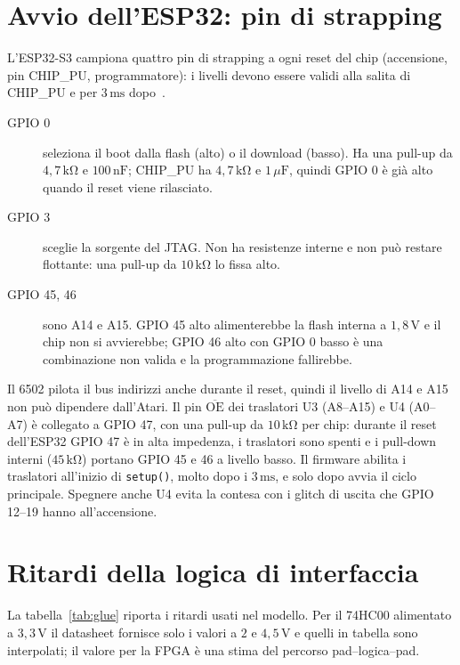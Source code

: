\documentclass[11pt,a4paper,twoside,openright]{report}
\DeclareRobustCommand{\code}[1]{\begingroup\renewcommand{\_}{\textunderscore\allowbreak}\texttt{#1}\endgroup}
\newcommand{\sig}[1]{\textsf{#1}}
\begin{document}
\section{Avvio dell'ESP32: pin di strapping}
\label{sec:strapping}

L'ESP32-S3 campiona quattro pin di strapping a ogni reset del chip (accensione, pin
\sig{CHIP\_PU}, programmatore): i livelli devono essere validi alla salita di \sig{CHIP\_PU}
e per $3\,\mathrm{ms}$ dopo~\cite{esp32s3ds}.
\begin{description}
  \item[GPIO 0] seleziona il boot dalla flash (alto) o il download (basso). Ha una pull-up
        da $4{,}7\,\mathrm{k\Omega}$ e $100\,\mathrm{nF}$; \sig{CHIP\_PU} ha
        $4{,}7\,\mathrm{k\Omega}$ e $1\,\mu\mathrm{F}$, quindi GPIO 0 è già alto quando il
        reset viene rilasciato.
  \item[GPIO 3] sceglie la sorgente del JTAG. Non ha resistenze interne e non può restare
        flottante: una pull-up da $10\,\mathrm{k\Omega}$ lo fissa alto.
  \item[GPIO 45, 46] sono A14 e A15. GPIO 45 alto alimenterebbe la flash interna a
        $1{,}8\,\mathrm{V}$ e il chip non si avvierebbe; GPIO 46 alto con GPIO 0 basso è una
        combinazione non valida e la programmazione fallirebbe.
\end{description}
Il 6502 pilota il bus indirizzi anche durante il reset, quindi il livello di A14 e A15 non
può dipendere dall'Atari. Il pin $\overline{\text{OE}}$ dei traslatori U3 (A8--A15) e U4
(A0--A7) è collegato a GPIO 47, con una pull-up da $10\,\mathrm{k\Omega}$ per chip: durante il
reset dell'ESP32 GPIO 47 è in alta impedenza, i traslatori sono spenti e i pull-down interni
($45\,\mathrm{k\Omega}$) portano GPIO 45 e 46 a livello basso. Il firmware abilita i
traslatori all'inizio di \code{setup()}, molto dopo i $3\,\mathrm{ms}$, e solo dopo avvia il
ciclo principale. Spegnere anche U4 evita la contesa con i glitch di uscita che GPIO 12--19
hanno all'accensione.

\section{Ritardi della logica di interfaccia}

La tabella~\ref{tab:glue} riporta i ritardi usati nel modello. Per il 74HC00 alimentato a
$3{,}3\,\mathrm{V}$ il datasheet fornisce solo i valori a $2$ e $4{,}5\,\mathrm{V}$ e quelli in
tabella sono interpolati; il valore per la FPGA è una stima del percorso pad--logica--pad.
\end{document}
